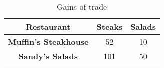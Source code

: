 \begin{table}
    \begin{tabular}{|c|c|c|}
      \hline
      \textbf{Restaurant} & \textbf{Steaks} & \textbf{Salads} \\
      \hline
      \textbf{Muffin's Steakhouse} & 52 & 10 \\
      \hline
      \textbf{Sandy's Salads} & 101 & 50 \\
      \hline
    \end{tabular}
    \caption{Gains of trade}
  \end{table}